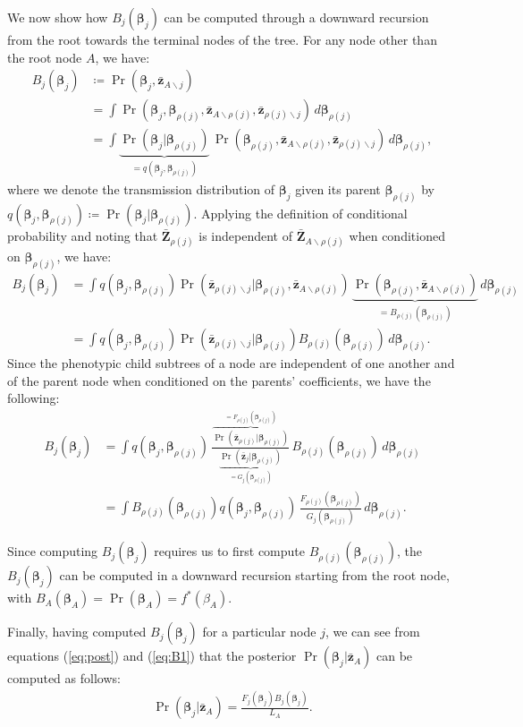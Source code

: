 \documentclass[10pt]{article}
\newcommand{\B}{\symbf{\beta}}
\newcommand{\bz}{\bar{\symbf{z}}}
\newcommand{\ssm}{\smallsetminus}
\begin{document}
We now show how $B_j(\B_j)$ can be computed through a downward recursion from the root towards the terminal nodes of the tree. For any node other than the root node $A$, we have:
\begin{align*}
  B_j(\B_j) &\coloneqq \Pr(\B_j, \bz_{A\ssm j})\\
            &= \int \Pr(\B_j, \B_{\rho(j)}, \bz_{A\ssm \rho(j)}, \bz_{\rho(j)\ssm j}) \,d\B_{\rho(j)}\\
            &= \int \underbrace{\Pr(\B_j | \B_{\rho(j)})}_{=q(\B_j,\B_{\rho(j)})}
              \, \Pr(\B_{\rho(j)}, \bz_{A\ssm \rho(j)}, \bz_{\rho(j)\ssm j}) \,d\B_{\rho(j)},
\end{align*}
where we denote the transmission distribution of $\B_j$ given its parent $\B_{\rho(j)}$ by $q(\B_j,\B_{\rho(j)}) \coloneqq \Pr(\B_j | \B_{\rho(j)})$.
Applying the definition of conditional probability and noting that $\bar{\symbf{Z}}_{\rho(j)}$ is independent of $\bar{\symbf{Z}}_{A\ssm \rho(j)}$ when conditioned on  $\B_{\rho(j)}$, we have:
\begin{align}
  B_j(\B_j)  &= \int q(\B_j,\B_{\rho(j)}) \Pr(\bz_{\rho(j)\ssm j} | \B_{\rho(j)}, \bz_{A\ssm \rho(j)}) \,
              \underbrace{\Pr(\B_{\rho(j)}, \bz_{A\ssm \rho(j)})}_{=B_{\rho(j)}(\B_{\rho(j)})} \,d\B_{\rho(j)} \nonumber\\
            &= \int q(\B_j,\B_{\rho(j)}) \Pr(\bz_{\rho(j)\ssm j} | \B_{\rho(j)})
              B_{\rho(j)}(\B_{\rho(j)}) \,d\B_{\rho(j)}. \label{eq:bdown1}
\end{align}
Since the phenotypic child subtrees of a node are independent of one another and of the parent node when conditioned on the parents' coefficients, we have the following:
\begin{align}
  B_j(\B_j) &= \int q(\B_j,\B_{\rho(j)}) \, 
              \frac{\overbrace{\Pr(\bz_{\rho(j)} | \B_{\rho(j)})}^{=F_{\rho(j)}(\B_{\rho(j)})}}
              {\underbrace{\Pr(\bz_{j} | \B_{\rho(j)})}_{=G_j(\B_{\rho(j)})}}
              \, B_{\rho(j)}(\B_{\rho(j)}) \,d\B_{\rho(j)} \label{eq:bdown2}\\
            &= \int B_{\rho(j)}(\B_{\rho(j)}) 
              q(\B_j,\B_{\rho(j)})\, 
              \frac{F_{\rho(j)}(\B_{\rho(j)})}
              {G_j(\B_{\rho(j)})} \,d\B_{\rho(j)}. \nonumber
\end{align}

Since computing $B_j(\B_j)$ requires us to first compute $B_{\rho(j)}(\B_{\rho(j)})$, the $B_j(\B_j)$ can be computed in a downward recursion starting from the root node, with $B_A(\B_A) = \Pr(\B_A) = f^*(\beta_A)$.


Finally, having computed $B_j(\B_j)$ for a particular node $j$, we can see from equations (\ref{eq:post}) and (\ref{eq:B1}) that the posterior $\Pr(\B_j|\bz_A)$ can be computed as follows:
\begin{align*}
  \Pr(\B_j|\bz_A) = \frac{F_j(\B_j) B_j(\B_j)}{L_A}.
\end{align*}
\end{document}
